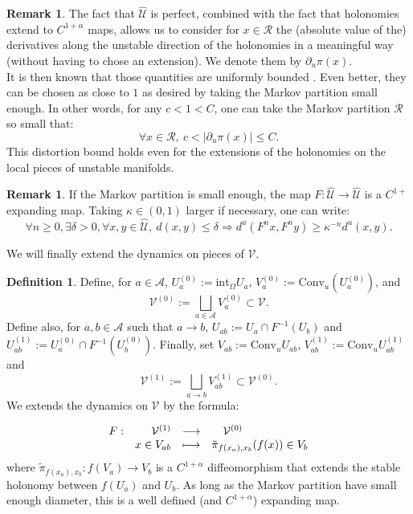 \documentclass[a4paper]{article}
\theoremstyle{definition}
\newtheorem{definition}{Definition}[section]
\newtheorem{remark}[example]{Remark}
\begin{document}
\begin{remark}
The fact that $\widehat{\mathcal{U}}$ is perfect, combined with the fact that holonomies extend to $C^{1+\alpha}$ maps, allows us to consider for $x \in \mathcal{R}$ the (absolute value of the) derivatives along the unstable direction of the holonomies in a meaningful way (without having to chose an extension). We denote them by $ \partial_u \pi(x) $.  \\

It is then known that those quantities are uniformly bounded \cite{PR02}. Even better, they can be chosen as close to $1$ as desired by taking the Markov partition small enough. In other words, for any $c < 1 < C$, one can take the Markov partition $\mathcal{R}$ so small that:
$$ \forall x \in \mathcal{R}, \ c < |\partial_u \pi(x)| \leq C .$$
This distortion bound holds even for the extensions of the holonomies on the local pieces of unstable manifolds.
\end{remark}

\begin{remark}
If the Markov partition is small enough, the map $F : \widehat{\mathcal{U}} \rightarrow \widehat{\mathcal{U}}$ is a $C^{1+}$ expanding map. Taking $\kappa \in (0,1)$ larger if necessary, one can write:
$$ \forall n \geq 0, \exists \delta>0, \forall x,y \in \widehat{\mathcal{U}}, \ d(x,y) \leq \delta \Rightarrow d^u(F^n x, F^n y) \geq \kappa^{-n} d^{u}(x,y). $$
\end{remark}

We will finally extend the dynamics on pieces of $\mathcal{V}$. 

\begin{definition}
Define, for $a \in \mathcal{A}$, $U_a^{(0)} := \text{int}_\Omega U_a$, $ V^{(0)}_a := \text{Conv}_u\left(  U_a^{(0)} \right) $, and $$ \mathcal{V}^{(0)} := \bigsqcup_{a \in \mathcal{A}} V_a^{(0)} \subset \mathcal{V}.$$ Define also, for $a,b \in \mathcal{A}$ such that $a \rightarrow b$, $U_{ab} := U_a \cap F^{-1}(U_b) $ and $U_{ab}^{(1)} := U_a^{(0)} \cap F^{-1}(U_b^{(0)})$. Finally, set $V_{ab} := \text{Conv}_u U_{ab} $, $ V_{ab}^{(1)} := \text{Conv}_u U_{ab}^{(1)}  $ and $$ \mathcal{V}^{(1)} := \bigsqcup_{a \rightarrow b} V_{ab}^{(1)} \subset \mathcal{V}^{(0)} .$$ We extends the dynamics on $\mathcal{V}$ by the formula:

$$ \begin{array}[t]{lrcl}
 F: &  \mathcal{V}^{(1)}  & \longrightarrow & \quad \mathcal{V}^{(0)} \\
    & x \in V_{ab}  & \longmapsto &  \tilde{\pi}_{f(x_a),x_b} (f(x)) \in V_b  \end{array}  $$
where $\tilde{\pi}_{f(x_a),x_b} : f(V_a) \rightarrow V_b$ is a $C^{1+\alpha}$ diffeomorphism that extends the stable holonomy between $f(U_a)$ and $U_b$. As long as the Markov partition have small enough diameter, this is a well defined (and $C^{1+\alpha}$) expanding map.
\end{definition}
\end{document}
